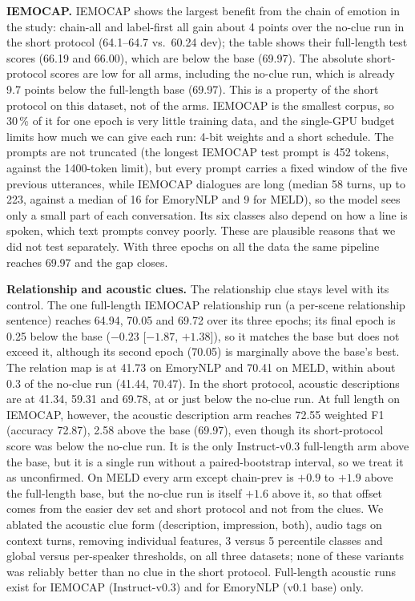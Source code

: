 \documentclass[lettersize,journal]{IEEEtran}
\begin{document}
\textbf{IEMOCAP.} IEMOCAP shows the largest benefit from the chain of emotion in the study: chain-all and label-first all gain about 4 points over the no-clue run in the short protocol (64.1--64.7 vs.\ 60.24 dev); the table shows their full-length test scores (66.19 and 66.00), which are below the base (69.97). The absolute short-protocol scores are low for all arms, including the no-clue run, which is already 9.7 points below the full-length base (69.97). This is a property of the short protocol on this dataset, not of the arms. IEMOCAP is the smallest corpus, so 30\,\% of it for one epoch is very little training data, and the single-GPU budget limits how much we can give each run: 4-bit weights and a short schedule. The prompts are not truncated (the longest IEMOCAP test prompt is 452 tokens, against the 1400-token limit), but every prompt carries a fixed window of the five previous utterances, while IEMOCAP dialogues are long (median 58 turns, up to 223, against a median of 16 for EmoryNLP and 9 for MELD), so the model sees only a small part of each conversation. Its six classes also depend on how a line is spoken, which text prompts convey poorly. These are plausible reasons that we did not test separately. With three epochs on all the data the same pipeline reaches 69.97 and the gap closes.

\textbf{Relationship and acoustic clues.} The relationship clue stays level with its control. The one full-length IEMOCAP relationship run (a per-scene relationship sentence) reaches 64.94, 70.05 and 69.72 over its three epochs; its final epoch is 0.25 below the base ($-0.23$ [$-1.87$, $+1.38$]), so it matches the base but does not exceed it, although its second epoch (70.05) is marginally above the base's best. The relation map is at 41.73 on EmoryNLP and 70.41 on MELD, within about 0.3 of the no-clue run (41.44, 70.47). In the short protocol, acoustic descriptions are at 41.34, 59.31 and 69.78, at or just below the no-clue run. At full length on IEMOCAP, however, the acoustic description arm reaches 72.55 weighted F1 (accuracy 72.87), 2.58 above the base (69.97), even though its short-protocol score was below the no-clue run. It is the only Instruct-v0.3 full-length arm above the base, but it is a single run without a paired-bootstrap interval, so we treat it as unconfirmed. On MELD every arm except chain-prev is $+0.9$ to $+1.9$ above the full-length base, but the no-clue run is itself $+1.6$ above it, so that offset comes from the easier dev set and short protocol and not from the clues. We ablated the acoustic clue form (description, impression, both), audio tags on context turns, removing individual features, 3 versus 5 percentile classes and global versus per-speaker thresholds, on all three datasets; none of these variants was reliably better than no clue in the short protocol. Full-length acoustic runs exist for IEMOCAP (Instruct-v0.3) and for EmoryNLP (v0.1 base) only.
\end{document}
